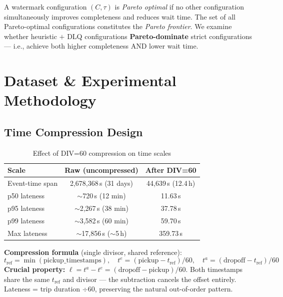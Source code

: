 \documentclass[11pt,a4paper]{article}
\newcommand{\eventtime}{t^{e}}
\newcommand{\arrivaltime}{t^{a}}
\newcommand{\lateness}{\ell}
\begin{document}
A watermark configuration $(C, \tau)$ is \textit{Pareto optimal} if no other configuration simultaneously improves completeness and reduces wait time.
The set of all Pareto-optimal configurations constitutes the \textit{Pareto frontier}.
We examine whether heuristic $+$ DLQ configurations \textbf{Pareto-dominate} strict configurations --- i.e., achieve both higher completeness AND lower wait time.

\section{Dataset \& Experimental Methodology}

\subsection{Time Compression Design}

\begin{table}[H]
\centering
\caption{Effect of DIV=60 compression on time scales}
\label{tab:compression}
\begin{tabular}{lcc}
\toprule
\textbf{Scale} & \textbf{Raw (uncompressed)} & \textbf{After DIV=60} \\
\midrule
Event-time span & 2,678,368\,s (31 days) & 44,639\,s (12.4\,h) \\
p50 lateness   & $\sim$720\,s (12 min)   & 11.63\,s \\
p95 lateness   & $\sim$2,267\,s (38 min)  & 37.78\,s \\
p99 lateness   & $\sim$3,582\,s (60 min)  & 59.70\,s \\
Max lateness   & $\sim$17,856\,s ($\sim$5\,h) & 359.73\,s \\
\bottomrule
\end{tabular}
\end{table}

\textbf{Compression formula} (single divisor, shared reference):
\begin{equation}
  t_{\text{ref}} = \min(\text{pickup\_timestamps}),\quad
  \eventtime = (\text{pickup} - t_{\text{ref}}) / 60,\quad
  \arrivaltime = (\text{dropoff} - t_{\text{ref}}) / 60
\end{equation}
\textbf{Crucial property:} $\lateness = \arrivaltime - \eventtime = (\text{dropoff} - \text{pickup}) / 60$.
Both timestamps share the same $t_{\text{ref}}$ and divisor --- the subtraction cancels the offset entirely.
Lateness = trip duration $\div 60$, preserving the natural out-of-order pattern.
\end{document}
